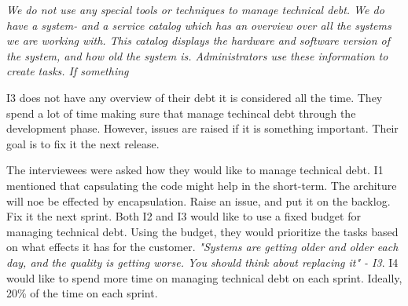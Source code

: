 \begin{displayquote}
	\textit{We do not use any special tools or techniques to manage technical debt. We do have a system- and a service catalog which has an overview over all the systems we are working with. This catalog displays the hardware and software version of the system, and how old the system is. Administrators use these information to create tasks. If something }
\end{displayquote}

I3 does not have any overview of their debt it is considered all the time. They spend a lot of time making sure that manage techincal debt through the development phase. However, issues are raised if it is something important. Their goal is to fix it the next release.  


The interviewees were asked how they would like to manage technical debt. I1 mentioned that capsulating the code might help in the short-term. The architure will noe be effected by encapsulation. Raise an issue, and put it on the backlog. Fix it the next sprint. Both I2 and I3 would like to use a fixed budget for managing technical debt. Using the budget, they would prioritize the tasks based on what effects it has for the customer. \textit{"Systems are getting older and older each day, and the quality is getting worse. You should think about replacing it" - I3}. I4 would like to spend more time on managing technical debt on each sprint. Ideally, 20\% of the time on each sprint.


